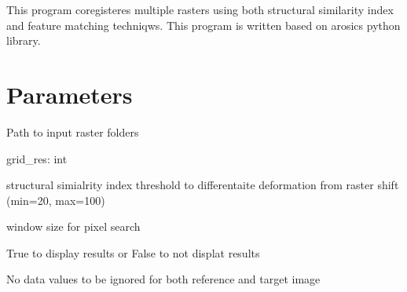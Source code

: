 \documentclass[letterpaper,10pt]{sphinxmanual}
\begin{document}
\begin{fulllineitems}
\label{\detokenize{generated/akhdefo_functions.Coregistration:akhdefo_functions.Coregistration}}
\pysigstartsignatures
{}
\pysigstopsignatures
\sphinxAtStartPar
This program coregisteres multiple rasters using both structural similarity index and feature matching techniqws.
This program is written based on arosics python library.


\section{Parameters}
\label{\detokenize{generated/akhdefo_functions.Coregistration:parameters}}\begin{description}
\sphinxAtStartPar
Path to input raster folders

\end{description}

\sphinxAtStartPar
grid\_res: int
\begin{description}
\sphinxAtStartPar
structural simialrity index threshold to differentaite deformation from raster shift (min=20, max=100)

\sphinxAtStartPar
window size for pixel search

\sphinxAtStartPar
True to display results or False to not displat results

\sphinxAtStartPar
No data values to be ignored for both reference and target image


\end{description}
\end{fulllineitems}
\end{document}
